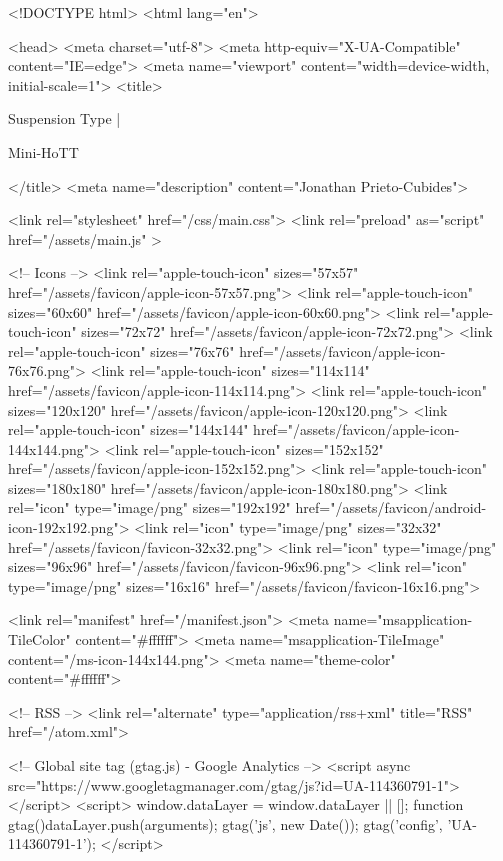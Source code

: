 <!DOCTYPE html>
<html lang="en">

<head>
  <meta charset="utf-8">
  <meta http-equiv="X-UA-Compatible" content="IE=edge">
  <meta name="viewport" content="width=device-width, initial-scale=1">
  <title>
    
      
        Suspension Type |
      
        Mini-HoTT
    
  </title>
  <meta name="description" content="Jonathan Prieto-Cubides">

  <link rel="stylesheet" href="/css/main.css">
  <link rel="preload" as="script" href="/assets/main.js" >

  <!-- Icons -->
  <link rel="apple-touch-icon" sizes="57x57" href="/assets/favicon/apple-icon-57x57.png">
  <link rel="apple-touch-icon" sizes="60x60" href="/assets/favicon/apple-icon-60x60.png">
  <link rel="apple-touch-icon" sizes="72x72" href="/assets/favicon/apple-icon-72x72.png">
  <link rel="apple-touch-icon" sizes="76x76" href="/assets/favicon/apple-icon-76x76.png">
  <link rel="apple-touch-icon" sizes="114x114" href="/assets/favicon/apple-icon-114x114.png">
  <link rel="apple-touch-icon" sizes="120x120" href="/assets/favicon/apple-icon-120x120.png">
  <link rel="apple-touch-icon" sizes="144x144" href="/assets/favicon/apple-icon-144x144.png">
  <link rel="apple-touch-icon" sizes="152x152" href="/assets/favicon/apple-icon-152x152.png">
  <link rel="apple-touch-icon" sizes="180x180" href="/assets/favicon/apple-icon-180x180.png">
  <link rel="icon" type="image/png" sizes="192x192"  href="/assets/favicon/android-icon-192x192.png">
  <link rel="icon" type="image/png" sizes="32x32" href="/assets/favicon/favicon-32x32.png">
  <link rel="icon" type="image/png" sizes="96x96" href="/assets/favicon/favicon-96x96.png">
  <link rel="icon" type="image/png" sizes="16x16" href="/assets/favicon/favicon-16x16.png">

  <link rel="manifest" href="/manifest.json">
  <meta name="msapplication-TileColor" content="#ffffff">
  <meta name="msapplication-TileImage" content="/ms-icon-144x144.png">
  <meta name="theme-color" content="#ffffff">

  <!-- RSS -->
  <link rel="alternate" type="application/rss+xml" title="RSS" href="/atom.xml">

  <!-- Global site tag (gtag.js) - Google Analytics -->
  <script async src="https://www.googletagmanager.com/gtag/js?id=UA-114360791-1"></script>
  <script>
    window.dataLayer = window.dataLayer || [];
    function gtag(){dataLayer.push(arguments);}
    gtag('js', new Date());
    gtag('config', 'UA-114360791-1');
  </script>

